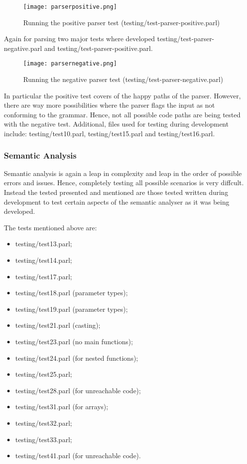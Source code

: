 \begin{figure}[H]
\centering
\texttt{[image: parserpositive.png]}
\caption{Running the positive parser test
(testing/test-parser-positive.parl)}
\end{figure}

Again for parsing two major tests where developed
testing/test-parser-negative.parl and
testing/test-parser-positive.parl.

\begin{figure}[H]
\centering
\texttt{[image: parsernegative.png]}
\caption{Running the negative parser test
(testing/test-parser-negative.parl)}
\end{figure}

In particular the positive test covers of the happy paths of the
parser. However, there are way more possibilities where the
parser flags the input as not conforming to the grammar. Hence,
not all possible code paths are being tested with the negative
test. Additional, files used for testing during development
include: testing/test10.parl, testing/test15.parl and
testing/test16.parl.

\subsubsection{Semantic Analysis}

Semantic analysis is again a leap in complexity and leap in the
order of possible errors and issues. Hence, completely testing
all possible scenarios is very diffcult. Instead the tested
presented and mentioned are those tested written during
development to test certain aspects of the semantic analyser as
it was being developed.

The tests mentioned above are:

\begin{itemize}
    \item testing/test13.parl;
    \item testing/test14.parl;
    \item testing/test17.parl;
    \item testing/test18.parl (parameter types);
    \item testing/test19.parl (parameter types);
    \item testing/test21.parl (casting);
    \item testing/test23.parl (no main functions);
    \item testing/test24.parl (for nested functions);
    \item testing/test25.parl;
    \item testing/test28.parl (for unreachable code);
    \item testing/test31.parl (for arrays);
    \item testing/test32.parl;
    \item testing/test33.parl;
    \item testing/test41.parl (for unreachable code).
\end{itemize}
